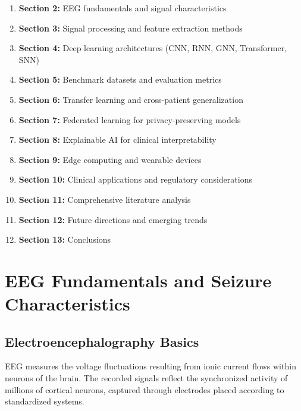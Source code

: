 \documentclass[12pt,a4paper]{article}
\begin{document}
\begin{enumerate}
    \item \textbf{Section 2:} EEG fundamentals and signal characteristics
    \item \textbf{Section 3:} Signal processing and feature extraction methods
    \item \textbf{Section 4:} Deep learning architectures (CNN, RNN, GNN, Transformer, SNN)
    \item \textbf{Section 5:} Benchmark datasets and evaluation metrics
    \item \textbf{Section 6:} Transfer learning and cross-patient generalization
    \item \textbf{Section 7:} Federated learning for privacy-preserving models
    \item \textbf{Section 8:} Explainable AI for clinical interpretability
    \item \textbf{Section 9:} Edge computing and wearable devices
    \item \textbf{Section 10:} Clinical applications and regulatory considerations
    \item \textbf{Section 11:} Comprehensive literature analysis
    \item \textbf{Section 12:} Future directions and emerging trends
    \item \textbf{Section 13:} Conclusions
\end{enumerate}

\section{EEG Fundamentals and Seizure Characteristics}

\subsection{Electroencephalography Basics}

EEG measures the voltage fluctuations resulting from ionic current flows within neurons of the brain. The recorded signals reflect the synchronized activity of millions of cortical neurons, captured through electrodes placed according to standardized systems.
\end{document}
